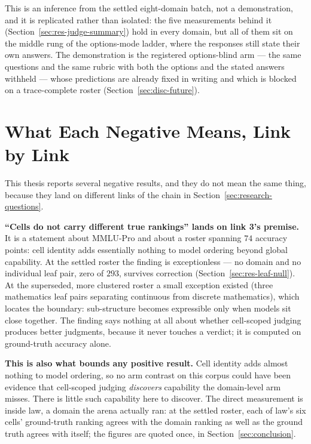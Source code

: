 This is an inference from the settled eight-domain batch, not a
demonstration, and it is replicated rather than isolated: the five
measurements behind it (Section~\ref{sec:res-judge-summary}) hold in
every domain, but all of them sit on the middle rung of the
options-mode ladder, where the responses still state their own
answers. The demonstration is the registered options-blind arm ---
the same questions and the same rubric with both the options and the
stated answers withheld --- whose predictions are already fixed in
writing and which is blocked on a trace-complete roster
(Section~\ref{sec:disc-future}).

\section{What Each Negative Means, Link by Link}\label{sec:disc-rq2}

This thesis reports several negative results, and they
do not mean the same thing, because they land on different links of the
chain in Section~\ref{sec:research-questions}.

\textbf{``Cells do not carry different true rankings'' lands on link 3's
premise.} It is a statement about MMLU-Pro and about a roster spanning
$74$ accuracy points: cell identity adds essentially nothing to model
ordering beyond global capability. At the settled roster the finding
is exceptionless --- no domain and no individual leaf pair, zero of
$293$, survives correction (Section~\ref{sec:res-leaf-null}). At the
superseded, more clustered roster a small exception existed (three
mathematics leaf pairs separating continuous from discrete
mathematics), which locates the boundary: sub-structure becomes
expressible only when models sit close together. The finding says
nothing at all about whether cell-scoped judging produces better
judgments, because it never touches a verdict; it is computed on
ground-truth accuracy alone.

\textbf{This is also what bounds any positive result.}
Cell identity adds almost nothing to model ordering, so no arm contrast
on this corpus could have been evidence that cell-scoped judging
\emph{discovers} capability the domain-level arm misses. There is little
such capability here to discover. The direct measurement is inside law, a
domain the arena actually ran: at the settled roster, each of law's six
cells' ground-truth ranking agrees with the domain ranking as well as
the ground truth agrees with itself; the figures are quoted once, in
Section~\ref{sec:conclusion}.

